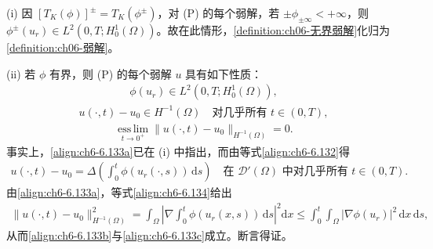 \documentclass[../../main.tex]{subfiles}%
\begin{document}
\begin{remark}\label{remark:ch06-6.7.1}
(i) 因 $[T_K(\phi)]^\pm=T_K(\phi^\pm)$，对 (P) 的每个弱解，若 $\pm\phi_{\pm\infty}<+\infty$，则 $\phi^\pm(u_r)\in L^2(0,T;H^1_0(\Omega))$。故在此情形，\cref{definition:ch06-无界弱解}化归为\cref{definition:ch06-弱解}。

(ii) 若 $\phi$ 有界，则 (P) 的每个弱解 $u$ 具有如下性质：
\begin{align}
\phi(u_r)\in L^2(0,T;H^1_0(\Omega)), \label{align:ch6-6.133a}
\end{align}
\begin{align}
u(\cdot,t)-u_0\in H^{-1}(\Omega)\quad\text{对几乎所有 }t\in(0,T), \label{align:ch6-6.133b}
\end{align}
\begin{align}
\operatorname*{ess\,lim}_{t\to0^+}\|u(\cdot,t)-u_0\|_{H^{-1}(\Omega)}=0. \label{align:ch6-6.133c}
\end{align}
事实上，\eqref{align:ch6-6.133a}已在 (i) 中指出，而由等式\eqref{align:ch6-6.132}得
\begin{align}
u(\cdot,t)-u_0=\Delta\left(\int_0^t\phi(u_r(\cdot,s))\,\mathrm{d}s\right)
\quad\text{在 }\mathscr{D}'(\Omega)\text{ 中对几乎所有 }t\in(0,T). \label{align:ch6-6.134}
\end{align}
由\eqref{align:ch6-6.133a}，等式\eqref{align:ch6-6.134}给出
\begin{align*}
\|u(\cdot,t)-u_0\|^2_{H^{-1}(\Omega)}
=\int_\Omega\left|\nabla\int_0^t\phi(u_r(x,s))\,\mathrm{d}s\right|^2\mathrm{d}x
\leqslant\int_0^t\int_\Omega|\nabla\phi(u_r)|^2\,\mathrm{d}x\,\mathrm{d}s,
\end{align*}
从而\eqref{align:ch6-6.133b}与\eqref{align:ch6-6.133c}成立。断言得证。
\end{remark}
\end{document}
